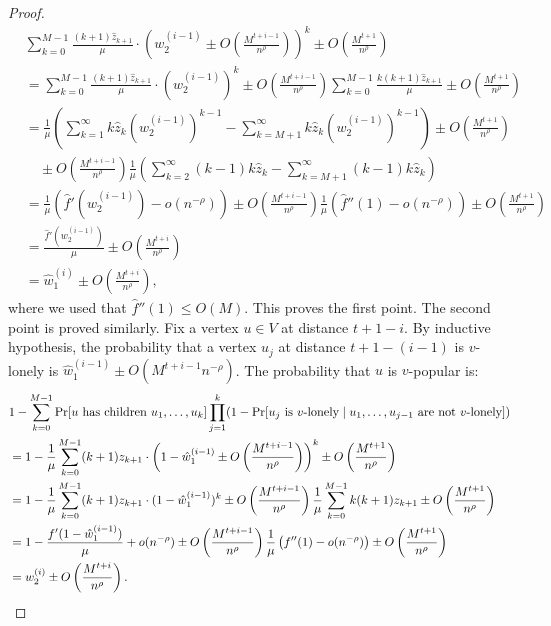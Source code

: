 \documentclass[11pt]{article}
\newcommand{\maxdeg}{M}
\begin{document}
\begin{toappendix}
\begin{proof}
\begin{align*}
&\sum_{k=0}^{\maxdeg-1} \frac{(k+1)\hat{z}_{k+1}}{\mu} \cdot \left(w_2^{(i-1)} \pm O\left(\frac{\maxdeg^{t+i-1}}{ n^{\rho}}\right)\right)^k \pm O\left(\frac{
\maxdeg^{t+1}}{n^\rho}\right)\\
& = \sum_{k=0}^{\maxdeg-1} \frac{(k+1)\hat{z}_{k+1}}{\mu} \cdot \left(w_2^{(i-1)}\right)^k \pm O\left(\frac{\maxdeg^{t+i-1}}{ n^{\rho}}\right) \sum_{k=0}^{\maxdeg-1} \frac{k(k+1)\hat{z}_{k+1}}{\mu} \pm O\left(\frac{
\maxdeg^{t+1}}{n^\rho}\right)\\
& = \frac1\mu \left( \sum_{k=1}^\infty k\hat{z}_{k} \left(w_2^{(i-1)}\right)^{k-1} -\sum_{k=\maxdeg+1}^\infty k\hat{z}_{k} \left(w_2^{(i-1)}\right)^{k-1}\right) \pm O\left(\frac{
\maxdeg^{t+1}}{n^\rho}\right) \\
&\quad \pm O\left(\frac{\maxdeg^{t+i-1}}{ n^{\rho}}\right) \frac1\mu \left( \sum_{k=2}^{\infty} (k-1)k\hat{z}_{k} - \sum_{k=\maxdeg+1}^{\infty} (k-1)k\hat{z}_{k} \right)\\
&= \frac1\mu \left( \hat{f}'(w_2^{(i-1)}) -o(n^{-\rho})\right) \pm O\left(\frac{\maxdeg^{t+i-1}}{ n^{\rho}}\right) \frac1\mu \left( \hat{f}''(1) - o(n^{-\rho}) \right) \pm O\left(\frac{
\maxdeg^{t+1}}{n^\rho}\right)\\
& = \frac{\hat{f}'(w_2^{(i-1)})}{\mu} \pm O\left(\frac{
\maxdeg^{t+i}}{n^\rho}\right)\\
& = \hat{w}_1^{(i)} \pm O\left(\frac{
\maxdeg^{t+i}}{n^\rho}\right),
\end{align*}
where we used that $\hat{f}''(1) \leq O(\maxdeg)$. This proves the first point. The second point is proved similarly. Fix a vertex $u\in V$ at distance $t+1-i$. By inductive hypothesis, the probability that a vertex $u_j$ at distance $t+1-(i-1)$ is $v$-lonely is $\hat{w}_1^{(i-1)} \pm O(\maxdeg^{t+i-1}n^{-\rho})$. The probability that $u$ is $v$-popular is:
\begin{align*}
&1 - \sum_{k=0}^{\maxdeg-1} \Pr[u\text{ has children }u_1,\dots,u_k] \prod_{j=1}^k (1 - \Pr[u_j\text{ is $v$-lonely} \mid u_1,\dots,u_{j-1}\text{ are not $v$-lonely}])\\
&= 1 - \frac1\mu \sum_{k=0}^{\maxdeg-1} (k+1)z_{k+1} \cdot \left(1 - \hat{w}_1^{(i-1)} \pm O\left(\frac{\maxdeg^{t+i-1}}{n^{\rho}}\right)\right)^k \pm O\left(\frac{\maxdeg^{t+1}}{n^{\rho}}\right)\\
& = 1 - \frac1\mu \sum_{k=0}^{\maxdeg-1} (k+1)z_{k+1} \cdot (1-\hat{w}_1^{(i-1)})^k \pm O\left(\frac{\maxdeg^{t+i-1}}{n^{\rho}}\right)\frac1\mu \sum_{k=0}^{\maxdeg-1} k(k+1)z_{k+1}\pm O\left(\frac{\maxdeg^{t+1}}{n^{\rho}}\right)\\
& = 1 - \frac{f'(1-\hat{w}_1^{(i-1)})}{\mu} + o(n^{-\rho}) \pm O\left(\frac{\maxdeg^{t+i-1}}{n^{\rho}}\right)\frac1\mu\left(f''(1) - o(n^{-\rho}) \right) \pm O\left(\frac{\maxdeg^{t+1}}{n^{\rho}}\right)\\
&=w_2^{(i)} \pm O\left(\frac{\maxdeg^{t+i}}{n^{\rho}}\right). \qedhere
\end{align*}
\end{proof}


\end{toappendix}
\end{document}
